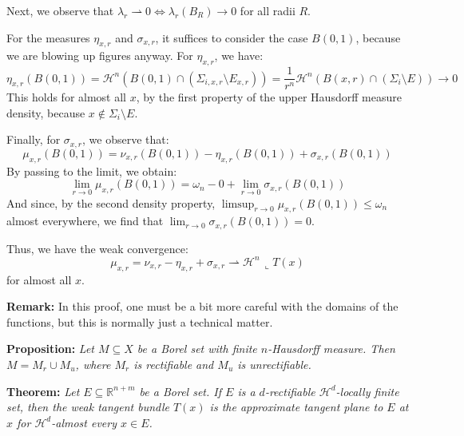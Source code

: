 \vspace{1ex}
Next, we observe that $\lambda_r\rightharpoonup 0\Leftrightarrow \lambda_r(B_R)\rightarrow 0$ for all radii $R$.

\vspace{1ex}
For the measures $\eta_{x,r}$ and $\sigma_{x,r}$, it suffices to consider the case $B(0,1)$, because we are blowing up figures anyway. For $\eta_{x,r}$, we have:
\[\eta_{x,r}(B(0, 1))=\mathcal H^n(B(0, 1)\cap(\Sigma_{i,x,r}\setminus E_{x,r}))=
\frac{1}{r^n}\mathcal H^n(B(x,r)\cap(\Sigma_i\setminus E))\rightarrow 0\]
This holds for almost all $x$, by the first property of the upper Hausdorff measure density, because $x \notin \Sigma_i \setminus E$.

\vspace{1ex}
Finally, for $\sigma_{x,r}$, we observe that:
\[\mu_{x,r}(B(0,1))=\nu_{x,r}(B(0,1))-\eta_{x,r}(B(0,1))+\sigma_{x,r}(B(0,1))\]
By passing to the limit, we obtain:
\[\lim_{r\to 0}\mu_{x,r}(B(0,1))=\omega_n-0+\lim_{r\to 0}\sigma_{x,r}(B(0,1))\]
And since, by the second density property, $\limsup_{r\to 0}\mu_{x,r}(B(0,1)) \le \omega_n$ almost everywhere, we find that $\lim_{r\to 0}\sigma_{x,r}(B(0,1))=0$.

Thus, we have the weak convergence:
\[\mu_{x,r}=\nu_{x,r}-\eta_{x,r}+\sigma_{x,r}\rightharpoonup\mathcal H^n\,\llcorner T(x)\]
for almost all $x$.

\vspace{1ex}
\textbf{Remark:} In this proof, one must be a bit more careful with the domains of the functions, but this is normally just a technical matter.

\vspace{2ex}
\textbf{Proposition:} \textit{Let $M\subseteq X$ be a Borel set with finite
$n$-Hausdorff measure. Then $M=M_r\cup M_u$, where $M_r$ is rectifiable
and $M_u$ is unrectifiable.}

\vspace{2ex}
\textbf{Theorem:} \textit{Let $E\subseteq\mathbb R^{n+m}$ be a Borel set. If $E$
is a $d$-rectifiable $\mathcal H^d$-locally finite set, then the weak tangent
bundle $T(x)$ is the approximate tangent plane to $E$ at $x$ for $\mathcal H^d$-almost
every $x\in E$.}
